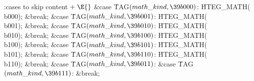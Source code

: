 \Y\B\4:cases to skip content\X${}\mathrel+\E{}$\6
\4\&{case} \.{TAG}${}(\index{math kind+\\{math\_kind}}\\{math\_kind},\39\\{b000}){}$:\5
\.{HTEG\_MATH}(\\{b000});\5
\&{break};\6
\4\&{case} \.{TAG}${}(\index{math kind+\\{math\_kind}}\\{math\_kind},\39\\{b001}){}$:\5
\.{HTEG\_MATH}(\\{b001});\5
\&{break};\6
\4\&{case} \.{TAG}${}(\index{math kind+\\{math\_kind}}\\{math\_kind},\39\\{b010}){}$:\5
\.{HTEG\_MATH}(\\{b010});\5
\&{break};\6
\4\&{case} \.{TAG}${}(\index{math kind+\\{math\_kind}}\\{math\_kind},\39\\{b100}){}$:\5
\.{HTEG\_MATH}(\\{b100});\5
\&{break};\6
\4\&{case} \.{TAG}${}(\index{math kind+\\{math\_kind}}\\{math\_kind},\39\\{b101}){}$:\5
\.{HTEG\_MATH}(\\{b101});\5
\&{break};\6
\4\&{case} \.{TAG}${}(\index{math kind+\\{math\_kind}}\\{math\_kind},\39\\{b110}){}$:\5
\.{HTEG\_MATH}(\\{b110});\5
\&{break};\6
\4\&{case} \.{TAG}${}(\index{math kind+\\{math\_kind}}\\{math\_kind},\39\\{b011}){}$:\5
\&{case} \.{TAG}${}(\index{math kind+\\{math\_kind}}\\{math\_kind},\39\\{b111}){}$:\5
\&{break};
\Y
\fi


